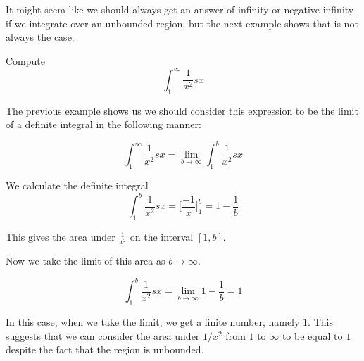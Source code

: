 \documentclass{ximera}
\begin{document}
It might seem like we should always get an answer of infinity or negative infinity if we integrate over an unbounded region, but the next example shows that is not always the case.

\begin{example}
Compute 
\[
\int_{1}^{\infty} \frac{1}{x^2} sx
\]

\begin{explanation}
The previous example shows us we should consider this expression to be the limit of a definite integral 
in the following manner:

\[
\int_{1}^{\infty} \frac{1}{x^2} sx=\lim_{b \to \infty} \int_{1}^{b} \frac{1}{x^2} sx
\]

We calculate the definite integral 
\[
\int_{1}^{b} \frac{1}{x^2} sx= \bigg[\frac{-1}{x}\bigg]_{1}^{b}=1-\frac{1}{b}
\]

This gives the area under $\frac{1}{x^2}$ on the interval $[1, b]$. 

\begin{image}
\end{image}

Now we take the limit of this area as $b \to \infty$. 

\[
\int_{1}^{b} \frac{1}{x^2} sx= \lim_{b \to \infty} 1-\frac{1}{b}=1
\]
  
In this case, when we take the limit, we get a finite number, namely $1$. This suggests that we can consider the 
area under $1/x^2$ from $1$ to $\infty$ to be equal to $1$ despite the fact that the region is unbounded. 



\end{explanation}
\end{example}
\end{document}
